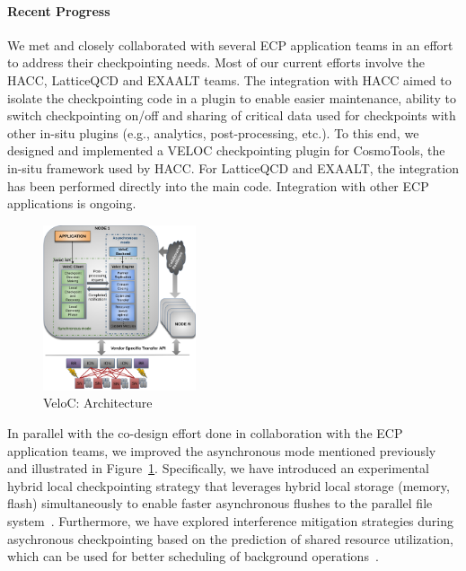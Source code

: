 \paragraph{Recent Progress}

We met and closely collaborated with several ECP application teams in
an effort to address their checkpointing needs. Most of our current
efforts involve the HACC, LatticeQCD and EXAALT teams. The integration
with HACC aimed to isolate the checkpointing code in a plugin to enable
easier maintenance, ability to switch checkpointing on/off and sharing
of critical data used for checkpoints with other in-situ plugins (e.g., analytics, post-processing, etc.). To this end, we designed and 
implemented a VELOC checkpointing plugin for CosmoTools, the
in-situ framework used by HACC. For LatticeQCD and EXAALT, the integration
has been performed directly into the main code. Integration with 
other ECP applications is ongoing.

\begin{figure}
  \includegraphics[width=0.4\textwidth]{projects/2.3.4-DataViz/2.3.4.14-VeloC-SZ/veloc-arch}
  \caption{VeloC: Architecture}%
  \label{fig:veloc:arch}%
\end{figure}


In parallel with the co-design effort done in collaboration with the
ECP application teams, we improved the asynchronous mode mentioned previously and illustrated in Figure~\ref{fig:veloc:arch}. Specifically, 
we have introduced an experimental hybrid local checkpointing strategy
that leverages hybrid local storage (memory, flash) simultaneously to
enable faster asynchronous flushes to the parallel file system~\cite{VeloCIPDPS19}. Furthermore, we have explored interference mitigation strategies
during asychronous checkpointing based on the prediction of shared
resource utilization, which can be used for better scheduling of
background operations~\cite{PredictionEuroPar19}.

